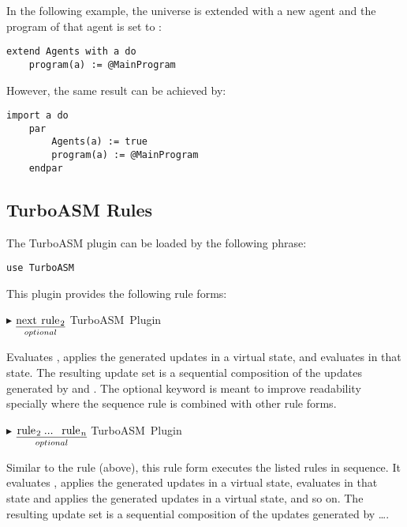 \documentclass{article}
\newcommand{\ruleform}[2]{\pform{$\blacktriangleright$}{#1}{#2}}
\newcommand{\pform}[3]{\vspace*{4mm} \noindent #1 #2 \vspace{1mm}\textcolor[gray]{0.7}{\dotfill}\mbox{{\sffamily \footnotesize #3}}}
\newcommand{\optional}[1]{$\underset{optional}{\underline{\mbox{#1}}}$}
\begin{document}
In the following example, the universe  is extended with a new agent and 
the program of that agent is set to :

\begin{lstlisting}
extend Agents with a do
	program(a) := @MainProgram
\end{lstlisting}

\noindent However, the same result can be achieved by:

\begin{lstlisting}
import a do
	par
		Agents(a) := true
		program(a) := @MainProgram
	endpar
\end{lstlisting}

\subsection{TurboASM Rules}
\label{turboasm}

The TurboASM plugin can be loaded by the following  phrase:

\begin{lstlisting}
use TurboASM
\end{lstlisting}

\noindent This plugin provides the following rule forms:

\ruleform{
	\optional{\asm{next rule$_2$}}
}{TurboASM Plugin}

Evaluates , applies the generated updates in a virtual state, and evaluates  in that state. 
The resulting update set is a sequential composition of the updates generated by  and .
The optional keyword  is meant to improve readability specially where the sequence rule is combined 
with other rule forms. 

\ruleform{
	\optional{\asm{rule$_2$ ... rule$_n$}}
	\asm{endseqblock}
}{TurboASM Plugin}

Similar to the  rule (above), this rule form executes the listed rules in sequence. It evaluates , 
applies the generated updates in a virtual state, evaluates  in that state and applies the generated 
updates in a virtual state, and so on. 
The resulting update set is a sequential composition of the updates generated by  \ldots {}.
\end{document}
